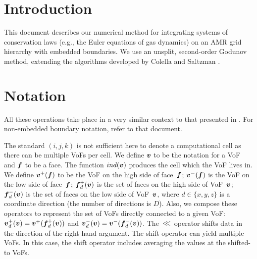 \section{Introduction}

This document describes our numerical method for integrating systems of
conservation laws (e.g., the Euler equations of gas dynamics) on
an AMR grid hierarchy with embedded boundaries.  
We use an unsplit, second-order Godunov method, extending the 
algorithms developed by Colella \cite{COLELLA1} and
Saltzman \cite{Saltzman1}.

\section{Notation}


All these operations take place in a very similar context to
that presented in \cite{ChomboDesign}.  For non-embedded boundary
notation, refer to that document. 

The standard $(i,j,k)$ is not sufficient here to denote a
computational cell as there can be multiple VoFs per cell.
We define ${\boldsymbol{v}}$ to be the notation for a VoF and ${\boldsymbol{f}}$
to be a face. The function $ind({\boldsymbol{v}})$ produces the 
cell which the VoF lives in.  We define ${\boldsymbol{v}}^+({\boldsymbol{f}})$ to be the
VoF on the high side of face~${\boldsymbol{f}}$; ${\boldsymbol{v}}^-({\boldsymbol{f}})$ 
is the VoF on the low side
of face~${\boldsymbol{f}}$; ${\boldsymbol{f}}^+_d({\boldsymbol{v}})$ is the set of faces on the high side of
VoF~${\boldsymbol{v}}$; ${\boldsymbol{f}}^-_d({\boldsymbol{v}})$ is the set of faces on the low side of VoF~${\boldsymbol{v}}$,
where $d\in\{x,y,z\}$ is a coordinate direction (the number of
directions is $D$).  Also, we compose these operators to represent the
set of VoFs directly connected to a given VoF:  ${\boldsymbol{v}}^+_d({\boldsymbol{v}}) =
{\boldsymbol{v}}^+({\boldsymbol{f}}^+_d({\boldsymbol{v}}))$ and ${\boldsymbol{v}}^-_d({\boldsymbol{v}}) = {\boldsymbol{v}}^-({\boldsymbol{f}}^-_d({\boldsymbol{v}}))$.
The ${} \! < \!\! < \! {}$ operator shifts data in the direction of the right hand
argument.   The shift operator can yield multiple VoFs.  In this 
case, the shift operator includes averaging the values at the shifted-to
VoFs.

